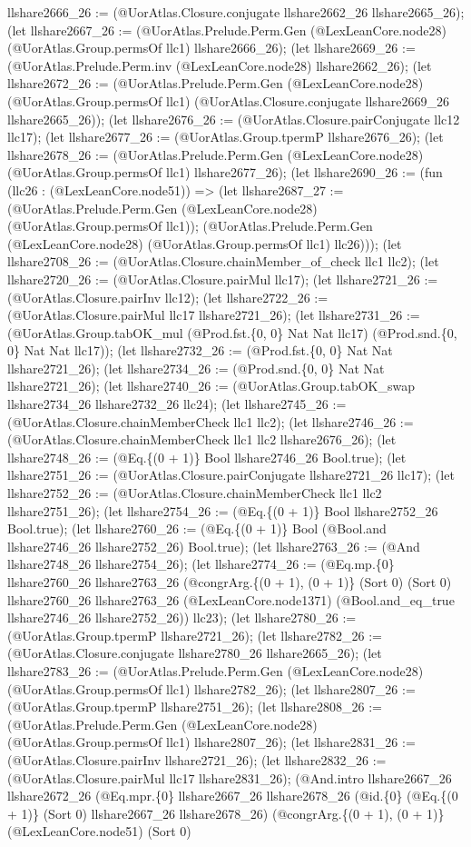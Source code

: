 \documentclass[11pt]{article}
\begin{document}
llshare2666\_26 := (@UorAtlas.Closure.conjugate llshare2662\_26 llshare2665\_26); (let llshare2667\_26 := (@UorAtlas.Prelude.Perm.Gen (@LexLeanCore.node28) (@UorAtlas.Group.permsOf llc1) llshare2666\_26); (let llshare2669\_26 := (@UorAtlas.Prelude.Perm.inv (@LexLeanCore.node28) llshare2662\_26); (let llshare2672\_26 := (@UorAtlas.Prelude.Perm.Gen (@LexLeanCore.node28) (@UorAtlas.Group.permsOf llc1) (@UorAtlas.Closure.conjugate llshare2669\_26 llshare2665\_26)); (let llshare2676\_26 := (@UorAtlas.Closure.pairConjugate llc12 llc17); (let llshare2677\_26 := (@UorAtlas.Group.tpermP llshare2676\_26); (let llshare2678\_26 := (@UorAtlas.Prelude.Perm.Gen (@LexLeanCore.node28) (@UorAtlas.Group.permsOf llc1) llshare2677\_26); (let llshare2690\_26 := (fun (llc26 : (@LexLeanCore.node51)) => (let llshare2687\_27 := (@UorAtlas.Prelude.Perm.Gen (@LexLeanCore.node28) (@UorAtlas.Group.permsOf llc1)); (@UorAtlas.Prelude.Perm.Gen (@LexLeanCore.node28) (@UorAtlas.Group.permsOf llc1) llc26))); (let llshare2708\_26 := (@UorAtlas.Closure.chainMember\_of\_check llc1 llc2); (let llshare2720\_26 := (@UorAtlas.Closure.pairMul llc17); (let llshare2721\_26 := (@UorAtlas.Closure.pairInv llc12); (let llshare2722\_26 := (@UorAtlas.Closure.pairMul llc17 llshare2721\_26); (let llshare2731\_26 := (@UorAtlas.Group.tabOK\_mul (@Prod.fst.\{0, 0\} Nat Nat llc17) (@Prod.snd.\{0, 0\} Nat Nat llc17)); (let llshare2732\_26 := (@Prod.fst.\{0, 0\} Nat Nat llshare2721\_26); (let llshare2734\_26 := (@Prod.snd.\{0, 0\} Nat Nat llshare2721\_26); (let llshare2740\_26 := (@UorAtlas.Group.tabOK\_swap llshare2734\_26 llshare2732\_26 llc24); (let llshare2745\_26 := (@UorAtlas.Closure.chainMemberCheck llc1 llc2); (let llshare2746\_26 := (@UorAtlas.Closure.chainMemberCheck llc1 llc2 llshare2676\_26); (let llshare2748\_26 := (@Eq.\{(0 + 1)\} Bool llshare2746\_26 Bool.true); (let llshare2751\_26 := (@UorAtlas.Closure.pairConjugate llshare2721\_26 llc17); (let llshare2752\_26 := (@UorAtlas.Closure.chainMemberCheck llc1 llc2 llshare2751\_26); (let llshare2754\_26 := (@Eq.\{(0 + 1)\} Bool llshare2752\_26 Bool.true); (let llshare2760\_26 := (@Eq.\{(0 + 1)\} Bool (@Bool.and llshare2746\_26 llshare2752\_26) Bool.true); (let llshare2763\_26 := (@And llshare2748\_26 llshare2754\_26); (let llshare2774\_26 := (@Eq.mp.\{0\} llshare2760\_26 llshare2763\_26 (@congrArg.\{(0 + 1), (0 + 1)\} (Sort 0) (Sort 0) llshare2760\_26 llshare2763\_26 (@LexLeanCore.node1371) (@Bool.and\_eq\_true llshare2746\_26 llshare2752\_26)) llc23); (let llshare2780\_26 := (@UorAtlas.Group.tpermP llshare2721\_26); (let llshare2782\_26 := (@UorAtlas.Closure.conjugate llshare2780\_26 llshare2665\_26); (let llshare2783\_26 := (@UorAtlas.Prelude.Perm.Gen (@LexLeanCore.node28) (@UorAtlas.Group.permsOf llc1) llshare2782\_26); (let llshare2807\_26 := (@UorAtlas.Group.tpermP llshare2751\_26); (let llshare2808\_26 := (@UorAtlas.Prelude.Perm.Gen (@LexLeanCore.node28) (@UorAtlas.Group.permsOf llc1) llshare2807\_26); (let llshare2831\_26 := (@UorAtlas.Closure.pairInv llshare2721\_26); (let llshare2832\_26 := (@UorAtlas.Closure.pairMul llc17 llshare2831\_26); (@And.intro llshare2667\_26 llshare2672\_26 (@Eq.mpr.\{0\} llshare2667\_26 llshare2678\_26 (@id.\{0\} (@Eq.\{(0 + 1)\} (Sort 0) llshare2667\_26 llshare2678\_26) (@congrArg.\{(0 + 1), (0 + 1)\} (@LexLeanCore.node51) (Sort 0) 
\end{document}
